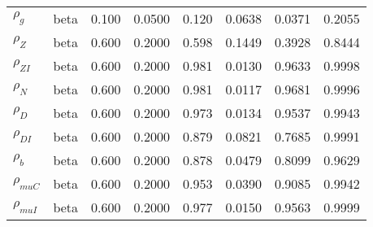 \begin{center}
\begin{longtable}{llcccccc}
${\rho_g}$ & beta &   0.100 & 0.0500 &   0.120& 0.0638 &  0.0371 &  0.2055 \\ 
${\rho_Z}$ & beta &   0.600 & 0.2000 &   0.598& 0.1449 &  0.3928 &  0.8444 \\ 
${\rho_{ZI}}$ & beta &   0.600 & 0.2000 &   0.981& 0.0130 &  0.9633 &  0.9998 \\ 
${\rho_N}$ & beta &   0.600 & 0.2000 &   0.981& 0.0117 &  0.9681 &  0.9996 \\ 
${\rho_D}$ & beta &   0.600 & 0.2000 &   0.973& 0.0134 &  0.9537 &  0.9943 \\ 
${\rho_{DI}}$ & beta &   0.600 & 0.2000 &   0.879& 0.0821 &  0.7685 &  0.9991 \\ 
${\rho_b}$ & beta &   0.600 & 0.2000 &   0.878& 0.0479 &  0.8099 &  0.9629 \\ 
${\rho_{muC}}$ & beta &   0.600 & 0.2000 &   0.953& 0.0390 &  0.9085 &  0.9942 \\ 
${\rho_{muI}}$ & beta &   0.600 & 0.2000 &   0.977& 0.0150 &  0.9563 &  0.9999 \\ 
\end{longtable}
 \end{center}
